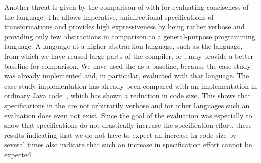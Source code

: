 Another threat is given by the comparison of \commonalities with \reactions for evaluating conciseness of the language.
The \reactionslanguage allows imperative, unidirectional specifications of transformations and provides high expressiveness by being rather verbose and providing only few abstractions in comparison to a general-purpose programming language.
A language at a higher abstraction language, such as the \mappings language, from which we have reused large parts of the compiler, or \qvtr, may provide a better baseline for comparison.
We have used the \reactionslanguage as a baseline, because the case study was already implemented and, in particular, evaluated with that language.
The case study implementation has already been compared with an implementation in ordinary Java code~, which has shown a reduction in code size.
This shows that specifications in the \reactionslanguage are not arbitrarily verbose and for other languages such an evaluation does even not exist.
Since the goal of the evaluation was especially to show that \commonalities specifications do not drastically increase the specification effort, these results indicating that we do not have to expect an increase in code size by several times also indicate that such an increase in specification effort cannot be expected.


